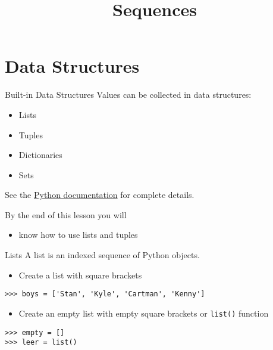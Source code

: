\documentclass[smaller, aspectratio=1610]{beamer}
\date{}
\title{Sequences}
\begin{document}
\maketitle

\section{Data Structures}
\label{sec:orgbee7a9d}

\begin{frame}[label={sec:orgbe50946}]{Built-in Data Structures}
Values can be collected in data structures:

\begin{itemize}
\item Lists
\item Tuples
\item Dictionaries
\item Sets
\end{itemize}

See the \href{https://docs.python.org/3.6/library/stdtypes.html}{Python documentation} for
complete details.

By the end of this lesson you will

\begin{itemize}
\item know how to use lists and tuples
\end{itemize}
\end{frame}

\begin{frame}[label={sec:org269a248},fragile]{Lists}
 A list is an indexed sequence of Python objects.

\begin{itemize}
\item Create a list with square brackets
\end{itemize}

\lstset{language=Python,label= ,caption= ,captionpos=b,numbers=none}
\begin{lstlisting}
>>> boys = ['Stan', 'Kyle', 'Cartman', 'Kenny']
\end{lstlisting}

\begin{itemize}
\item Create an empty list with empty square brackets or \texttt{list()} function
\end{itemize}

\lstset{language=Python,label= ,caption= ,captionpos=b,numbers=none}
\begin{lstlisting}
>>> empty = []
>>> leer = list()
\end{lstlisting}
\end{frame}
\end{document}
